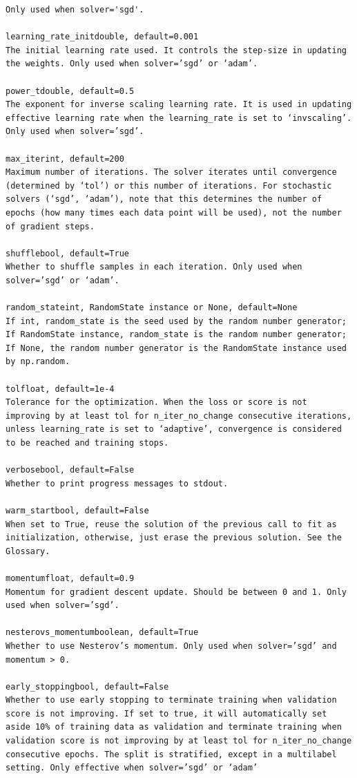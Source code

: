 \documentclass[12pt]{article}
\begin{document}
\begin{verbatim}
Only used when solver='sgd'.

learning_rate_initdouble, default=0.001
The initial learning rate used. It controls the step-size in updating the weights. Only used when solver=’sgd’ or ‘adam’.

power_tdouble, default=0.5
The exponent for inverse scaling learning rate. It is used in updating effective learning rate when the learning_rate is set to ‘invscaling’. Only used when solver=’sgd’.

max_iterint, default=200
Maximum number of iterations. The solver iterates until convergence (determined by ‘tol’) or this number of iterations. For stochastic solvers (‘sgd’, ‘adam’), note that this determines the number of epochs (how many times each data point will be used), not the number of gradient steps.

shufflebool, default=True
Whether to shuffle samples in each iteration. Only used when solver=’sgd’ or ‘adam’.

random_stateint, RandomState instance or None, default=None
If int, random_state is the seed used by the random number generator; If RandomState instance, random_state is the random number generator; If None, the random number generator is the RandomState instance used by np.random.

tolfloat, default=1e-4
Tolerance for the optimization. When the loss or score is not improving by at least tol for n_iter_no_change consecutive iterations, unless learning_rate is set to ‘adaptive’, convergence is considered to be reached and training stops.

verbosebool, default=False
Whether to print progress messages to stdout.

warm_startbool, default=False
When set to True, reuse the solution of the previous call to fit as initialization, otherwise, just erase the previous solution. See the Glossary.

momentumfloat, default=0.9
Momentum for gradient descent update. Should be between 0 and 1. Only used when solver=’sgd’.

nesterovs_momentumboolean, default=True
Whether to use Nesterov’s momentum. Only used when solver=’sgd’ and momentum > 0.

early_stoppingbool, default=False
Whether to use early stopping to terminate training when validation score is not improving. If set to true, it will automatically set aside 10% of training data as validation and terminate training when validation score is not improving by at least tol for n_iter_no_change consecutive epochs. The split is stratified, except in a multilabel setting. Only effective when solver=’sgd’ or ‘adam’


\end{verbatim}
\end{document}
